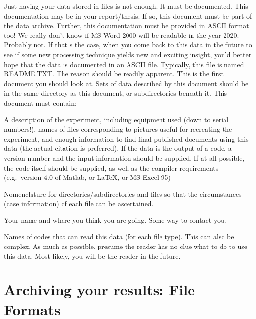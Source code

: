 \documentclass[a4paper]{article}
\begin{document}
Just having your data stored in files is not enough. It must be
documented. This documentation may be in your report/thesis. If so, this
document must be part of the data archive. Further, this documentation
must be provided in ASCII format too! We really don't know if MS Word
2000 will be readable in the year 2020. Probably not. If that s the
case, when you come back to this data in the future to see if some new
processing technique yields new and exciting insight, you'd better hope
that the data is documented in an ASCII file. Typically, this file is
named \textquotedbl{}README.TXT\textquotedbl{}. The reason should be readily apparent. This is the
first document you should look at. Sets of data described by this
document should be in the same directory as this document, or
subdirectories beneath it. This document must contain:
\begin{list}{.}
{
\setlength{\rightmargin}{\leftmargin}
}

\item A description of the experiment, including equipment used (down to
serial numbers!), names of files corresponding to pictures useful for
recreating the experiment, and enough information to find final
published documents using this data (the actual citation is
preferred). If the data is the output of a code, a version number and
the input information should be supplied. If at all possible, the
code itself should be supplied, as well as the compiler requirements
(e.g.~version 4.0 of Matlab, or LaTeX, or MS Excel 95)

\item Nomenclature for directories/subdirectories and files so that the
circumstances (case information) of each file can be ascertained.

\item Your name and where you think you are going. Some way to contact you.

\item Names of codes that can read this data (for each file type). This can
also be complex. As much as possible, presume the reader has no clue
what to do to use this data. Most likely, you will be the reader in
the future.
\end{list}


\section{Archiving your results: File Formats%
  \label{archiving-your-results-file-formats}%
}
\end{document}
